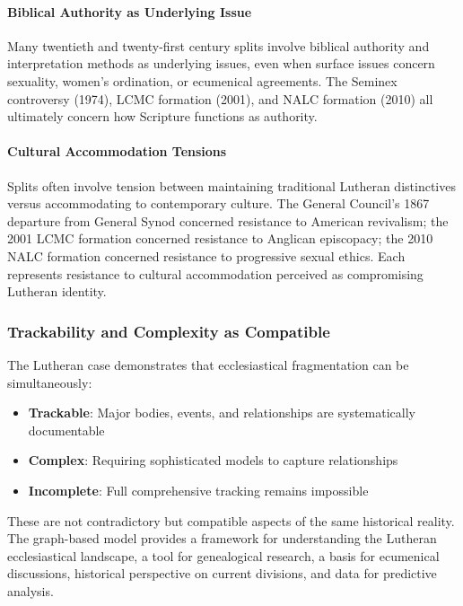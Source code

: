 \paragraph{Biblical Authority as Underlying Issue} Many twentieth and twenty-first century splits involve biblical authority and interpretation methods as underlying issues, even when surface issues concern sexuality, women's ordination, or ecumenical agreements. The Seminex controversy (1974), LCMC formation (2001), and NALC formation (2010) all ultimately concern how Scripture functions as authority.

\paragraph{Cultural Accommodation Tensions} Splits often involve tension between maintaining traditional Lutheran distinctives versus accommodating to contemporary culture. The General Council's 1867 departure from General Synod concerned resistance to American revivalism; the 2001 LCMC formation concerned resistance to Anglican episcopacy; the 2010 NALC formation concerned resistance to progressive sexual ethics. Each represents resistance to cultural accommodation perceived as compromising Lutheran identity.

\subsubsection{Trackability and Complexity as Compatible}

The Lutheran case demonstrates that ecclesiastical fragmentation can be simultaneously:

\begin{itemize}
\item \textbf{Trackable}: Major bodies, events, and relationships are systematically documentable
\item \textbf{Complex}: Requiring sophisticated models to capture relationships
\item \textbf{Incomplete}: Full comprehensive tracking remains impossible
\end{itemize}

These are not contradictory but compatible aspects of the same historical reality. The graph-based model provides a framework for understanding the Lutheran ecclesiastical landscape, a tool for genealogical research, a basis for ecumenical discussions, historical perspective on current divisions, and data for predictive analysis.

